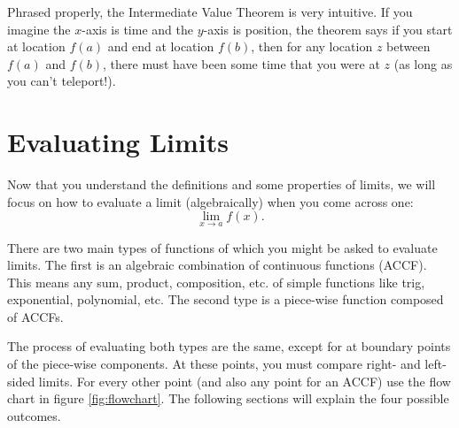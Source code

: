 Phrased properly, the Intermediate Value Theorem is very intuitive. If you imagine the $x$-axis is time and the $y$-axis is position, the theorem says if you start at location $f(a)$ and end at location $f(b)$, then for any location $z$ between $f(a)$ and $f(b)$, there must have been some time that you were at $z$ (as long as you can't teleport!).


\clearpage
\section{Evaluating Limits}
\label{sec:evaluating-limits}

Now that you understand the definitions and some properties of limits, we will focus on how to evaluate a limit (algebraically) when you come across one:
$$\lim_{x\to a}f(x).$$

There are two main types of functions of which you might be asked to evaluate limits. The first is an algebraic combination of continuous functions (ACCF). This means any sum, product, composition, etc. of simple functions like trig, exponential, polynomial, etc. The second type is a piece-wise function composed of ACCFs.


The process of evaluating both types are the same, except for at boundary points of the piece-wise components. At these points, you must compare right- and left-sided limits. For every other point (and also any point for an ACCF) use the flow chart in figure \ref{fig:flowchart}. The following sections will explain the four possible outcomes.

